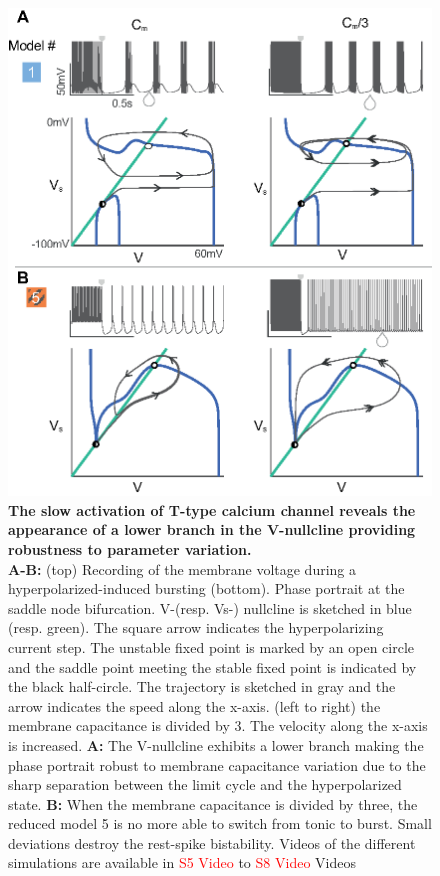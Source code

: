 \begin{figure}[h!]
\centering
\includegraphics[scale=1]{fig/Plos/Fig7}
\caption{ {\bf The slow activation of T-type calcium channel reveals the appearance of a lower branch in the V-nullcline providing robustness to parameter variation. }\\
\textbf{A-B:} (top) Recording of the membrane voltage during a hyperpolarized-induced bursting (bottom). Phase portrait at the saddle node bifurcation. V-(resp. Vs-) nullcline is sketched in blue (resp. green).  The square arrow indicates the hyperpolarizing current step. The unstable fixed point is marked by an open circle and the saddle point meeting the stable fixed point is indicated by the black half-circle. The trajectory is sketched in gray and the arrow indicates the speed along the x-axis. (left to right) the membrane capacitance is divided by 3.  The velocity along the x-axis is increased. 
\textbf{A:} The V-nullcline exhibits a lower branch making the phase portrait robust to membrane capacitance variation due to the sharp separation between the limit cycle and the hyperpolarized state.
\textbf{B:} When the membrane capacitance is divided by three, the reduced model 5 is no more able to switch from tonic to burst. Small deviations destroy the rest-spike bistability. Videos of the different simulations are available in \textcolor{red}{S5 Video} to \textcolor{red}{S8 Video} Videos}
\label{fig:7}
\end{figure}


